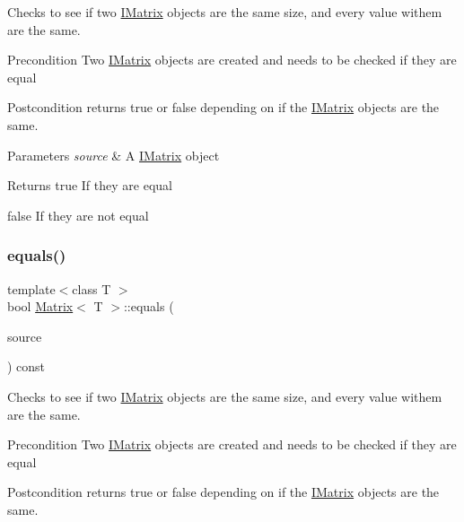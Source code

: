 Checks to see if two \mbox{\hyperlink{class_i_matrix}{I\+Matrix}} objects are the same size, and every value withem are the same. 

\begin{DoxyPrecond}{Precondition}
Two \mbox{\hyperlink{class_i_matrix}{I\+Matrix}} objects are created and needs to be checked if they are equal 
\end{DoxyPrecond}
\begin{DoxyPostcond}{Postcondition}
returns true or false depending on if the \mbox{\hyperlink{class_i_matrix}{I\+Matrix}} objects are the same.
\end{DoxyPostcond}

\begin{DoxyParams}{Parameters}
{\em source} & A \mbox{\hyperlink{class_i_matrix}{I\+Matrix}} object \\
\hline
\end{DoxyParams}
\begin{DoxyReturn}{Returns}
true If they are equal 

false If they are not equal 
\end{DoxyReturn}
\mbox{\label{class_matrix_a10dabe69f447e230871ecc91cbced548}} 
\subsubsection{\texorpdfstring{equals()}{equals()}\hspace{0.1cm}{\footnotesize\ttfamily [5/6]}}
{\footnotesize\ttfamily template$<$class T $>$ \\
bool \mbox{\hyperlink{class_matrix}{Matrix}}$<$ T $>$\+::equals (\begin{DoxyParamCaption}\item[{const \mbox{\hyperlink{class_i_matrix}{I\+Matrix}}$<$ \mbox{\hyperlink{class_s_matrix}{S\+Matrix}}$<$ T $>$, T $>$ \&}]{source }\end{DoxyParamCaption}) const}



Checks to see if two \mbox{\hyperlink{class_i_matrix}{I\+Matrix}} objects are the same size, and every value withem are the same. 

\begin{DoxyPrecond}{Precondition}
Two \mbox{\hyperlink{class_i_matrix}{I\+Matrix}} objects are created and needs to be checked if they are equal 
\end{DoxyPrecond}
\begin{DoxyPostcond}{Postcondition}
returns true or false depending on if the \mbox{\hyperlink{class_i_matrix}{I\+Matrix}} objects are the same.
\end{DoxyPostcond}


